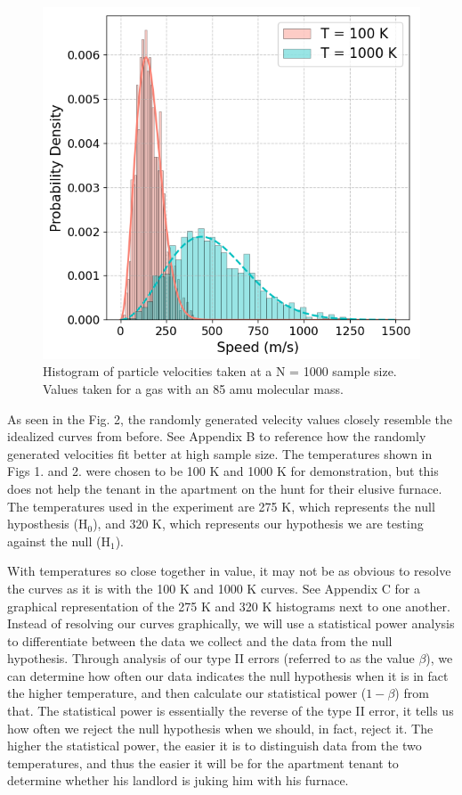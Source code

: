 \documentclass[%
 reprint,
 amsmath,amssymb,
 aps,
]{revtex4-2}
\begin{document}
\begin{figure}[h]
\caption{Histogram of particle velocities taken at a N = 1000 sample size. Values taken for a gas with an 85 amu molecular mass.}
\centering
	\includegraphics[scale=0.51]{code1}
\end{figure}

As seen in the Fig. 2, the randomly generated velecity values closely resemble the idealized curves from before. See Appendix B to reference how the randomly generated velocities fit better at high sample size. The temperatures shown in Figs 1. and 2. were chosen to be 100 K and 1000 K for demonstration, but this does not help the tenant in the apartment on the hunt for their elusive furnace. The temperatures used in the experiment are 275 K, which represents the null hyposthesis (H$_0$), and 320 K, which represents our hypothesis we are testing against the null (H$_1$).

With temperatures so close together in value, it may not be as obvious to resolve the curves as it is with the 100 K and 1000 K curves. See Appendix C for a graphical representation of the 275 K and 320 K histograms next to one another. Instead of resolving our curves graphically, we will use a statistical power analysis to differentiate between the data we collect and the data from the null hypothesis. Through analysis of our type II errors (referred to as the value $\beta$), we can determine how often our data indicates the null hypothesis when it is in fact the higher temperature, and then calculate our statistical power ($1-\beta$) from that. The statistical power is essentially the reverse of the type II error, it tells us how often we reject the null hypothesis when we should, in fact, reject it. The higher the statistical power, the easier it is to distinguish data from the two temperatures, and thus the easier it will be for the apartment tenant to determine whether his landlord is juking him with his furnace. 
\end{document}
